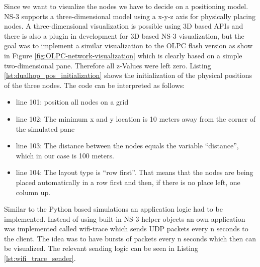 \texttt{\small }{\small \par}

Since we want to visualize the nodes we have to decide on a positioning
model. NS-3 supports a three-dimensional model using a x-y-z axis
for physically placing nodes. A three-dimensional visualization is
possible using 3D based APIs and there is also a plugin in development
for 3D based NS-3 visualization, but the goal was to implement a similar
visualization to the OLPC flash version as show in Figure \ref{fig:OLPC-network-visualization}
which is clearly based on a simple two-dimensional pane. Therefore
all z-Values were left zero. Listing \ref{lst:dualhop_pos_initialization}
shows the initialization of the physical positions of the three nodes.
The code can be interpreted as follows:
\begin{itemize}
\item line 101: position all nodes on a grid
\item line 102: The minimum x and y location is 10 meters away from the
corner of the simulated pane
\item line 103: The distance between the nodes equals the variable {}``distance'',
which in our case is 100 meters.
\item line 104: The layout type is {}``row first''. That means that the
nodes are being placed automatically in a row first and then, if there
is no place left, one column up.
\end{itemize}
\texttt{\small }{\small \par}

Similar to the Python based simulations an application logic had to
be implemented. Instead of using built-in NS-3 helper objects an own
application was implemented called wifi-trace which sends UDP packets
every n seconds to the client. The idea was to have bursts of packets
every n seconds which then can be visualized. The relevant sending
logic can be seen in Listing \ref{lst:wifi_trace_sender}.

\texttt{\small }{\small \par}

